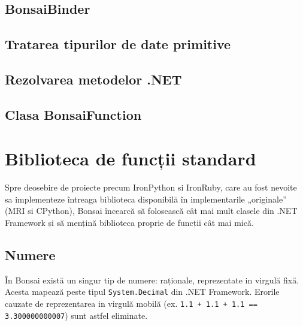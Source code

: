 \documentclass[12pt,a4paper]{memoir}
\begin{document}
\section{BonsaiBinder}


\section{Tratarea tipurilor de date primitive}


\section{Rezolvarea metodelor .NET}


\section{Clasa BonsaiFunction}


\chapter{Biblioteca de funcții standard}

Spre deosebire de proiecte precum IronPython si IronRuby, care au fost nevoite sa implementeze întreaga biblioteca disponibilă în implementarile „originale” (MRI\cite{ruby_mri} si CPython\cite{cpython}), Bonsai încearcă să folosească cât mai mult clasele din .NET Framework și să mențină biblioteca proprie de funcții cât mai mică.

\section{Numere}

În Bonsai există un singur tip de numere: raționale, reprezentate in virgulă fixă. Acesta mapează peste tipul \texttt{System.Decimal} din .NET Framework. Erorile cauzate de reprezentarea in virgulă mobilă (ex. \texttt{1.1 + 1.1 + 1.1 == 3.300000000007}) sunt astfel eliminate.
\end{document}
